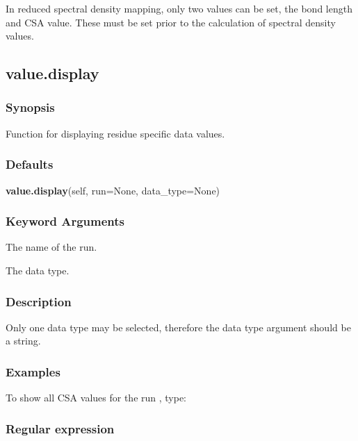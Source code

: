 In reduced spectral density mapping, only two values can be set, the bond length and CSA value.  These must be set prior to the calculation of spectral density values.




\newpage

\subsection{value.display}


\subsubsection{Synopsis}

Function for displaying residue specific data values.



\subsubsection{Defaults}

\textsf{\textbf{value.display}(self, run=None, data\_type=None)}


\subsubsection{Keyword Arguments}

  The name of the run. 

  The data type. 




\subsubsection{Description}

Only one data type may be selected, therefore the data type argument should be a string.



\subsubsection{Examples}

To show all CSA values for the run , type:




\subsubsection{Regular expression}

